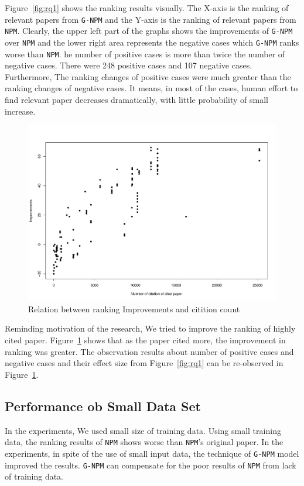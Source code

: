 \documentclass{llncs}
\newcommand{\name}{\texttt{G-NPM}\xspace}
\newcommand{\npm}{\texttt{NPM}\xspace}
\begin{document}
Figure~\ref{fig:rq1} shows the ranking results visually. The X-axis is the ranking of relevant papers from \name and the Y-axis is the ranking of relevant papers from \npm. Clearly, the upper left part of the graphs shows the improvements of \name over \npm and the lower right area represents the negative cases which \name ranks worse than \npm. he number of positive cases is more than twice the number of negative cases. There were 248 positive cases and 107 negative cases. Furthermore, The ranking changes of positive cases were much greater than the ranking changes of negative cases. It means, in most of the cases, human effort to find relevant paper decreases dramatically, with little probability of small increase.

\begin{figure}[ht]
\centering
\includegraphics[width= \textwidth]{rq1_2.pdf}
\caption{Relation between ranking Improvements and citition count \label{fig:rq1_2}}
\end{figure}

Reminding motivation of the research, We tried to improve the ranking of highly cited paper. Figure~\ref{fig:rq1_2} shows that as the paper cited more, the improvement in ranking was greater.  The observation results about number of positive cases and negative cases and their effect size from Figure~\ref{fig:rq1}  can be re-observed in  Figure~\ref{fig:rq1_2}.


\subsection{Performance ob Small Data Set}

In the experiments, We used small size of training data. Using small training data, the ranking results of \npm shows worse than \npm's original paper\cite{Huang:2015:NPM:2886521.2886655}. In the experiments, in spite of the use of small input data, the technique of \name model improved the results. \name can compensate for the poor results  of \npm from lack of training data.
\end{document}

